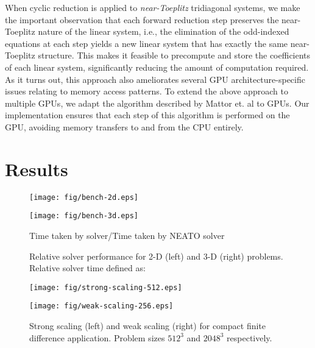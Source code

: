 \documentclass[letterpaper,10pt]{article}
\begin{document}
When cyclic reduction is applied to
\emph{near-Toeplitz} tridiagonal systems,
we make the important observation that
each forward reduction step preserves the near-Toeplitz
nature of the linear system, i.e.,
the elimination of the odd-indexed equations at each step
yields a new linear system that has
exactly the same near-Toeplitz structure.
This makes it feasible to precompute and store
the coefficients of each linear system,
significantly reducing the amount of computation required.
As it turns out,
this approach also ameliorates several
GPU architecture-specific issues relating to
memory access patterns.
To extend the above approach to multiple GPUs,
we adapt the algorithm described by Mattor et. al
to GPUs.
Our implementation ensures that
each step of this algorithm is performed on the GPU,
avoiding memory transfers to and from the CPU entirely.

\section{Results}

\begin{figure}
\centering
\begin{minipage}[b]{0.45\textwidth}
\begin{center}
\texttt{[image: fig/bench-2d.eps]}
\end{center}
\end{minipage}
\begin{minipage}[b]{0.45\textwidth}
\begin{center}
\texttt{[image: fig/bench-3d.eps]}
\end{center}
\end{minipage}
\caption{Relative solver performance
for 2-D (left) and 3-D (right) problems.
Relative solver time defined as:}
Time taken by solver/Time taken by NEATO solver
\label{fig:bench}
\end{figure}

\begin{figure}
\centering
\begin{minipage}[b]{0.45\textwidth}
\begin{center}
\texttt{[image: fig/strong-scaling-512.eps]}
\end{center}
\end{minipage}
%
\begin{minipage}[b]{0.45\textwidth}
\begin{center}
\texttt{[image: fig/weak-scaling-256.eps]}
\end{center}
\end{minipage}
\caption{Strong scaling (left) and weak scaling (right)
    for compact finite difference application.
    Problem sizes $512^3$ and $2048^3$ respectively.}
\label{fig:scaling}
\end{figure}
\end{document}
